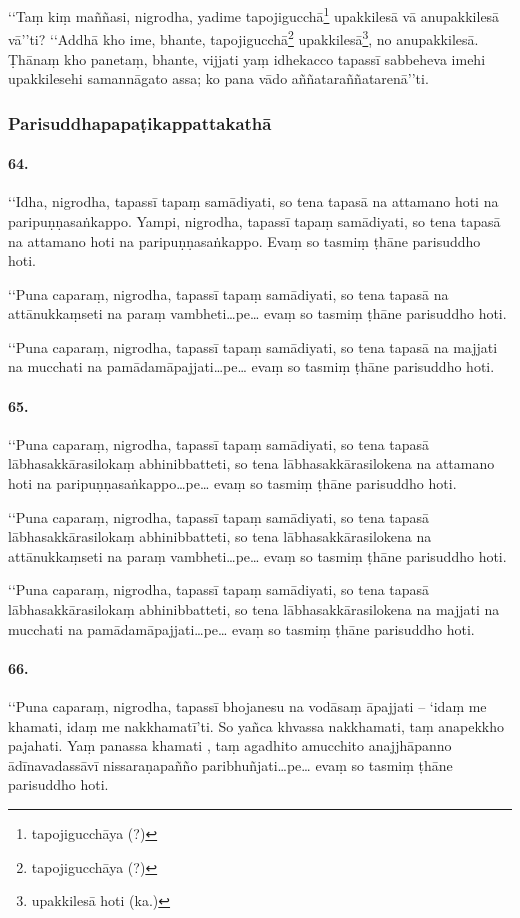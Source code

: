 ‘‘Taṃ kiṃ maññasi, nigrodha, yadime tapojigucchā\footnote{tapojigucchāya (?)} upakkilesā vā anupakkilesā vā’’ti? ‘‘Addhā kho ime, bhante, tapojigucchā\footnote{tapojigucchāya (?)} upakkilesā\footnote{upakkilesā hoti (ka.)}, no anupakkilesā. Ṭhānaṃ kho panetaṃ, bhante, vijjati yaṃ idhekacco tapassī sabbeheva imehi upakkilesehi samannāgato assa; ko pana vādo aññataraññatarenā’’ti.

\subsubsection{Parisuddhapapaṭikappattakathā}

\paragraph{64.} ‘‘Idha, nigrodha, tapassī tapaṃ samādiyati, so tena tapasā na attamano hoti na paripuṇṇasaṅkappo. Yampi, nigrodha, tapassī tapaṃ samādiyati, so tena tapasā na attamano hoti na paripuṇṇasaṅkappo. Evaṃ so tasmiṃ ṭhāne parisuddho hoti.

‘‘Puna caparaṃ, nigrodha, tapassī tapaṃ samādiyati, so tena tapasā na attānukkaṃseti na paraṃ vambheti…pe… evaṃ so tasmiṃ ṭhāne parisuddho hoti.

‘‘Puna caparaṃ, nigrodha, tapassī tapaṃ samādiyati, so tena tapasā na majjati na mucchati na pamādamāpajjati…pe… evaṃ so tasmiṃ ṭhāne parisuddho hoti.

\paragraph{65.} ‘‘Puna caparaṃ, nigrodha, tapassī tapaṃ samādiyati, so tena tapasā lābhasakkārasilokaṃ abhinibbatteti, so tena lābhasakkārasilokena na attamano hoti na paripuṇṇasaṅkappo…pe… evaṃ so tasmiṃ ṭhāne parisuddho hoti.

‘‘Puna caparaṃ, nigrodha, tapassī tapaṃ samādiyati, so tena tapasā lābhasakkārasilokaṃ abhinibbatteti, so tena lābhasakkārasilokena na attānukkaṃseti na paraṃ vambheti…pe… evaṃ so tasmiṃ ṭhāne parisuddho hoti.

‘‘Puna caparaṃ, nigrodha, tapassī tapaṃ samādiyati, so tena tapasā lābhasakkārasilokaṃ abhinibbatteti, so tena lābhasakkārasilokena na majjati na mucchati na pamādamāpajjati…pe… evaṃ so tasmiṃ ṭhāne parisuddho hoti.

\paragraph{66.} ‘‘Puna caparaṃ, nigrodha, tapassī bhojanesu na vodāsaṃ āpajjati – ‘idaṃ me khamati, idaṃ me nakkhamatī’ti. So yañca khvassa nakkhamati, taṃ anapekkho pajahati. Yaṃ panassa khamati , taṃ agadhito amucchito anajjhāpanno ādīnavadassāvī nissaraṇapañño paribhuñjati…pe… evaṃ so tasmiṃ ṭhāne parisuddho hoti.

